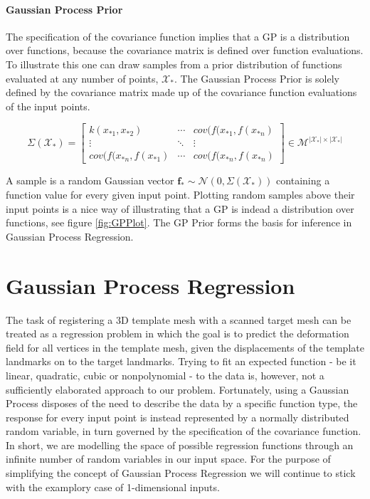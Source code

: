 \paragraph{Gaussian Process Prior}
The specification of the covariance function implies that a GP is a distribution over functions, because the covariance matrix is defined over function evaluations. To illustrate this one can draw samples from a prior distribution of functions evaluated at any number of points, $\mathcal{X}_{*}$. The Gaussian Process Prior is solely defined by the covariance matrix made up of the covariance function evaluations of the input points.

\begin{equation}
    \Sigma(\mathcal{X}_{*})=\begin{bmatrix}
k(x_{*1},x_{*2}) & \cdots & cov(f(x_{*1},f(x_{*n}) \\
\vdots & \ddots & \vdots \\
cov(f(x_{*n},f(x_{*1}) & \cdots & cov(f(x_{*n},f(x_{*n}) 
\end{bmatrix} \in \mathcal{M}^{\left|\mathcal{X}_{*}\right| \times \left|\mathcal{X}_{*}\right|} 
\end{equation}

A sample is a random Gaussian vector $\textbf{f}_{*} \sim \mathcal{N}(0, \Sigma(\mathcal{X}_{*}))$ containing a function value for every given input point. Plotting random
samples above their input points is a nice way of illustrating that a GP is indead a distribution over functions, see figure \ref{fig:GPPlot}. The GP Prior forms the basis for inference in Gaussian Process Regression.

\section{Gaussian Process Regression}
The task of registering a 3D template mesh with a scanned target mesh can be treated as a regression problem in which the goal is to predict the deformation field for all vertices in the template mesh, given the displacements of the template landmarks on to the target landmarks. Trying to fit an expected function - be it linear, quadratic, cubic or nonpolynomial - to the data is, however, not a sufficiently elaborated approach to our problem. 
Fortunately, using a Gaussian Process disposes of the need to describe the data by a specific function type, the response for every input point is instead represented by a normally distributed random variable, in turn governed by the specification of the covariance function. In short, we are modelling the space of possible regression functions through an infinite number of random variables in our input space. For the purpose of simplifying the concept of Gaussian Process Regression we will continue to stick with the examplory case of 1-dimensional inputs.

